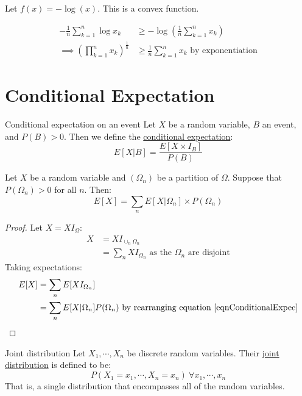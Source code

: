 \documentclass[../Main.tex]{subfiles}
\begin{document}
\begin{corollary}[AM-GM Inequality]
    Let $f(x) = -\log{(x)}$. This is a convex function.\par
    \begin{align*}
        -\frac{1}{n} \sum_{k=1}^n \log{x_k} & \geq -\log{(\frac{1}{n}\sum_{k=1}^n x_k)} \\
       \implies \left(\prod_{k=1}^n x_k\right)^{\frac{1}{n}} &\geq \frac{1}{n} \sum_{k=1}^n x_k \text{ by exponentiation}
    \end{align*}
    \label{corAMGM}
\end{corollary}
\section{Conditional Expectation}
\begin{definition}{Conditional expectation on an event}
    Let $X$ be a random variable, $B$ an event, and $P(B) > 0$. Then we define the \underline{conditional expectation}:
    \begin{equation}
        E[X | B] = \frac{E[X \times I_B]}{P(B)}
        \label{eqnConditionalExpec}
    \end{equation}
\end{definition}
\begin{lemma}
    Let $X$ be a random variable and $(\Omega_n)$ be a partition of $\Omega$. Suppose that $P(\Omega_n) > 0$ for all $n$. Then:
    \begin{equation*}
        E[X] = \sum_n E[X | \Omega_n] \times P(\Omega_n)
    \end{equation*}
\end{lemma}
\begin{proof}
    Let $X = XI_\Omega$:
    \begin{align*}
        X &= XI_{\cup_n \Omega_n} \\
        &= \sum_n XI_{\Omega_n} \text{ as the } \Omega_n \text{ are disjoint}
    \end{align*}
    Taking expectations:
    \begin{align*}
        E[X] &= \sum_n E[XI_{\Omega_n}] \\
        &= \sum_n E[X | \Omega_n] P(\Omega_n) \text{ by rearranging equation~\ref{eqnConditionalExpec}}
    \end{align*}
\end{proof}
\begin{definition}{Joint distribution}
    Let $X_1, \cdots, X_n$ be discrete random variables. Their \underline{joint distribution} is defined to be:
    \begin{equation*}
        P(X_1 = x_1, \cdots, X_n = x_n)~\forall x_1, \cdots, x_n
    \end{equation*}
    That is, a single distribution that encompasses all of the random variables.
\end{definition}
\end{document}
